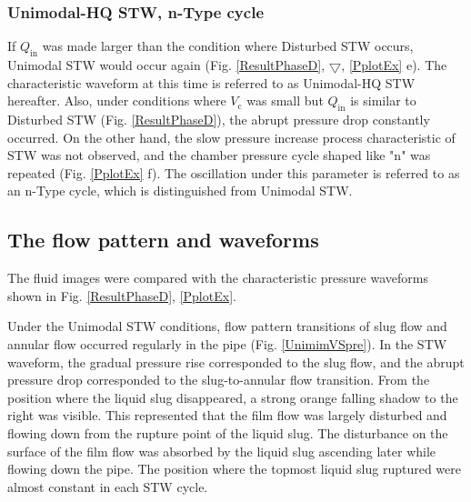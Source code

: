 \documentclass[aps,pre,preprint,groupedaddress,showkeys]{revtex4-2}
\begin{document}
\subsubsection{Unimodal-HQ STW, n-Type cycle}
If $Q_ \mathrm{in}$ was made larger than the condition where Disturbed STW occurs, Unimodal STW would occur again (Fig. \ref{ResultPhaseD}, $\bigtriangledown$, \ref{PplotEx} e).
The characteristic waveform at this time is referred to as Unimodal-HQ STW hereafter.
Also, under conditions where $ V_ \mathrm{c} $ was small but $ Q_\mathrm{in} $ is similar to Disturbed STW (Fig. \ref{ResultPhaseD}), the abrupt pressure drop constantly occurred.
On the other hand, the slow pressure increase process characteristic of STW was not observed, and the chamber pressure cycle shaped like "n" was repeated (Fig. \ref{PplotEx} f).
The oscillation under this parameter is referred to as an n-Type cycle, which is distinguished from Unimodal STW.

\subsection{The flow pattern and waveforms}
The fluid images were compared with the characteristic pressure waveforms shown in Fig. \ref{ResultPhaseD}, \ref{PplotEx}.

Under the Unimodal STW conditions, flow pattern transitions of slug flow and annular flow occurred regularly in the pipe (Fig. \ref{UnimimVSpre}).
In the STW waveform, the gradual pressure rise corresponded to the slug flow, and the abrupt pressure drop corresponded to the slug-to-annular flow transition. 
From the position where the liquid slug disappeared, a strong orange falling shadow to the right was visible.
This represented that the film flow was largely disturbed and flowing down from the rupture point of the liquid slug.
The disturbance on the surface of the film flow was absorbed by the liquid slug ascending later while flowing down the pipe.
The position where the topmost liquid slug ruptured were almost constant in each STW cycle.
\end{document}
